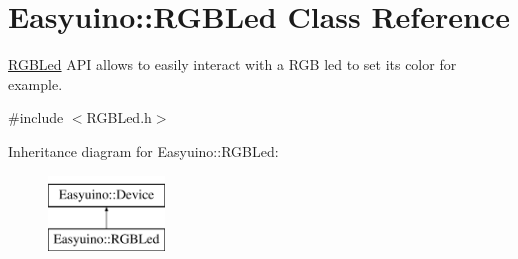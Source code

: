 \hypertarget{class_easyuino_1_1_r_g_b_led}{}\section{Easyuino\+:\+:R\+G\+B\+Led Class Reference}
\label{class_easyuino_1_1_r_g_b_led}


\hyperlink{class_easyuino_1_1_r_g_b_led}{R\+G\+B\+Led} A\+PI allows to easily interact with a R\+GB led to set its color for example.  




{\ttfamily \#include $<$R\+G\+B\+Led.\+h$>$}

Inheritance diagram for Easyuino\+:\+:R\+G\+B\+Led\+:\begin{figure}[H]
\begin{center}
\leavevmode
\includegraphics[height=2.000000cm]{class_easyuino_1_1_r_g_b_led}
\end{center}
\end{figure}
